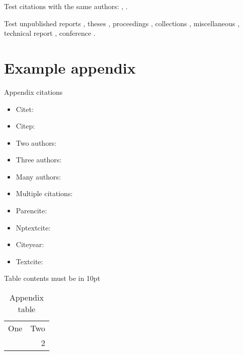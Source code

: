 \documentclass{mpi-far}
\begin{document}
Test citations with the same authors: \citep{ono2015marine,ono2015think,ono2015space},
\citet{ono2015marine,ono2015think,ono2015space}.

Test unpublished reports \citep{baker_census_2010},  theses \citep{carroll_rightwhale_2011},
proceedings \citep{bratten_working_1997},
collections \citep{gales_phocarctos_2008, sharp_sefra_2017},
miscellaneous \citep{delevie_hot_2014},
technical report \citep{helidoniotis_testing_2015}, conference \citep{newman_population_2008}.



\clearpage
\printbibliography

\clearpage
\newpage
\appendices
\section{Example appendix}
\label{app:the_appendix}

Appendix citations

\begin{itemize}
  \item Citet: \citet{baker_nzclassification_2010}
  \item Citep: \citep{doc_sealion_2009}
  \item Two authors: \citet{abraham_summary_98-09}
  \item Three authors: \citep{thompson_dolphin_2013}
  \item Many authors: \citep{baker_global_2007}
  \item Multiple citations: \citep{baker_global_2007, abraham_summary_98-09, gales_phocarctos_2008}
  \item Parencite: \parencite{gales_phocarctos_2008}
  \item Nptextcite: 
  \item Citeyear: \citeyear{robertson_population_2011}
  \item Textcite: \textcite{roe_necropsy_2007}
\end{itemize}

Table contents must be in 10pt

\begin{table}[h]
\caption{Appendix table}
\begin{center}
\fontsize{10}{12}\selectfont
\begin{tabular}{rr}
One & Two \\ \addlinespace
1 & 2
\end{tabular}
\end{center}
\end{table}
\end{document}
